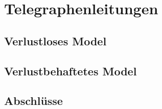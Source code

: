 \documentclass[paper=a4, parskip=half-, ngerman, fontsize=11pt]{scrreprt}
\begin{document}
\chapter{Telegraphenleitungen}

\section{Verlustloses Model}

\section{Verlustbehaftetes Model}

\section{Abschlüsse}


\printbibliography
\end{document}
